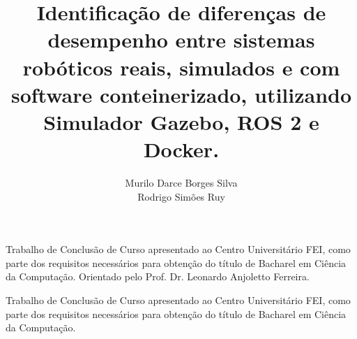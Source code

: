 \documentclass[rascunho,xindy,sublist]{fei}
\author{Murilo Darce Borges Silva\\Rodrigo Simões Ruy}
\title{Identificação de diferenças de desempenho entre sistemas robóticos reais, simulados e com software conteinerizado, utilizando Simulador Gazebo, ROS 2 e Docker.}
\begin{document}
\maketitle
\begin{folhaderosto}

Trabalho de Conclusão de Curso apresentado ao Centro Universitário FEI, como parte dos requisitos necessários para obtenção do título de Bacharel em Ciência da Computação. Orientado pelo Prof. Dr. Leonardo Anjoletto Ferreira.

\end{folhaderosto}



\begin{folhadeaprovacao}

Trabalho de Conclusão de Curso apresentado ao Centro Universitário FEI, como parte dos requisitos necessários para obtenção do título de Bacharel em Ciência da Computação.

\end{folhadeaprovacao}










\tableofcontents
\end{document}
